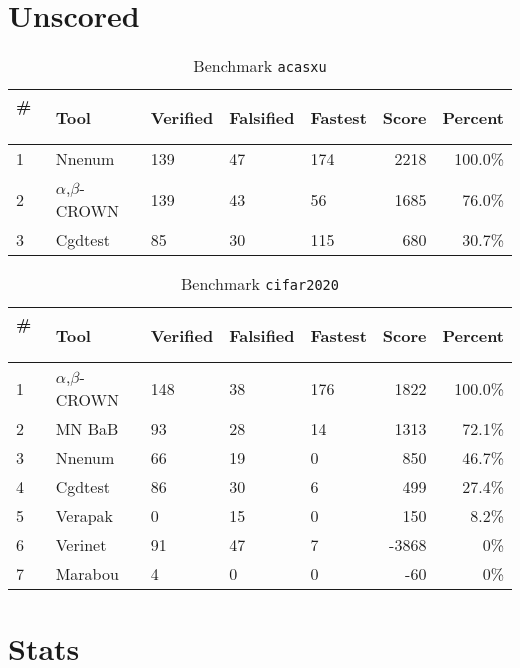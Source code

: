 \clearpage
\section{Unscored}


\begin{table}[h]
\begin{center}
\caption{Benchmark \texttt{acasxu}} \label{tab:cat_{cat}}
{\setlength{\tabcolsep}{2pt}
\begin{tabular}[h]{@{}lllllrr@{}}
\toprule
\textbf{\# ~} & \textbf{Tool} & \textbf{Verified} & \textbf{Falsified} & \textbf{Fastest} & \textbf{Score} & \textbf{Percent}\\
\midrule
1 & Nnenum & 139 & 47 & 174 & 2218 & 100.0\% \\
2 & $\alpha$,$\beta$-CROWN & 139 & 43 & 56 & 1685 & 76.0\% \\
3 & Cgdtest & 85 & 30 & 115 & 680 & 30.7\% \\
\bottomrule
\end{tabular}
}
\end{center}
\end{table}



\begin{table}[h]
\begin{center}
\caption{Benchmark \texttt{cifar2020}} \label{tab:cat_{cat}}
{\setlength{\tabcolsep}{2pt}
\begin{tabular}[h]{@{}lllllrr@{}}
\toprule
\textbf{\# ~} & \textbf{Tool} & \textbf{Verified} & \textbf{Falsified} & \textbf{Fastest} & \textbf{Score} & \textbf{Percent}\\
\midrule
1 & $\alpha$,$\beta$-CROWN & 148 & 38 & 176 & 1822 & 100.0\% \\
2 & MN BaB & 93 & 28 & 14 & 1313 & 72.1\% \\
3 & Nnenum & 66 & 19 & 0 & 850 & 46.7\% \\
4 & Cgdtest & 86 & 30 & 6 & 499 & 27.4\% \\
5 & Verapak & 0 & 15 & 0 & 150 & 8.2\% \\
6 & Verinet & 91 & 47 & 7 & -3868 & 0\% \\
7 & Marabou & 4 & 0 & 0 & -60 & 0\% \\
\bottomrule
\end{tabular}
}
\end{center}
\end{table}


\clearpage
\section{Stats}

